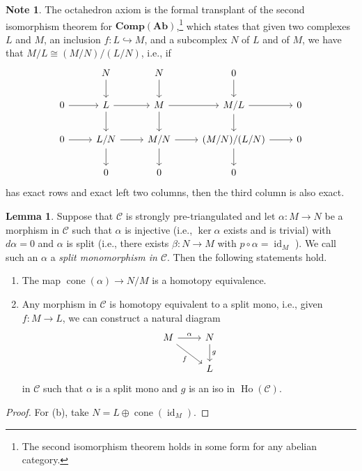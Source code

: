 \documentclass[10pt,letterpaper,cm]{nupset}
\theoremstyle{definition}
\newtheorem{note}{Note}
\newtheorem{lemma}{Lemma}
\newcommand{\1}{\mathbf{1}}
\renewcommand{\c}{\mathscr{C}}
\newcommand{\0}{\vec 0}
\DeclareMathOperator{\id}{id}
\DeclareMathOperator{\cone}{cone}
\DeclareMathOperator{\ho}{Ho}
\begin{document}
\begin{note}
The octahedron axiom is the formal transplant of the second isomorphism theorem for $\mathbf{Comp}(\mathbf{Ab})$,\footnote{The second isomorphism theorem holds in some form for any abelian category.} which states that given two complexes $L$ and $M$, an inclusion $f : L \hookrightarrow M$, and a subcomplex $N$ of $L$ and of $M$, we have that $ M/L \cong (M/N)/(L/N)$, i.e., if
\[
\begin{tikzcd}
            & N \arrow[d]   & N \arrow[d]   & 0 \arrow[d]                     &   \\
0 \arrow[r] & L \arrow[d] \arrow[r]   & M \arrow[d] \arrow[r]   & M/L \arrow[d] \arrow[r]         & 0 \\
0 \arrow[r] & L/N \arrow[d] \arrow[r] & M/N \arrow[d] \arrow[r] & (M/N)/(L/N) \arrow[d] \arrow[r] & 0 \\
            & 0                       & 0                       & 0                               &  
\end{tikzcd}
\]
has exact rows and exact left two columns, then the third column is also exact. 
\end{note}

\begin{lemma}
Suppose that $\c$ is strongly pre-triangulated and let $\alpha : M \to N$ be a morphism in $\c$ such that $\alpha$ is injective (i.e., $\ker{\alpha}$ exists and is trivial) with $d{\alpha} =0$ and $\alpha$ is split (i.e.,  there exists $\beta : N \to M$ with $p \circ \alpha = \id_M$ ). We call such an $\alpha$ a \textit{split monomorphism in $\c$}. Then the following statements hold.
\begin{enumerate}[label=(\alph*)]
\item The map $\cone(\alpha) \to N/M$ is a homotopy equivalence.
\item Any morphism in $\c$ is homotopy equivalent to a split mono, i.e., given $ f: M \to L$, we can construct a natural diagram 
\[
\begin{tikzcd}
M \arrow[r, "\alpha"] \arrow[rd, "f"'] & N \arrow[d, "g"] \\
                                       & L               
\end{tikzcd}
\]
in $\c$ such that $\alpha$ is a split mono and $g$ is an iso in $\ho(\c)$.
\end{enumerate}
\end{lemma}
\begin{proof}
For (b), take $N = L \oplus \cone(\id_M)$.
\end{proof}
\end{document}

